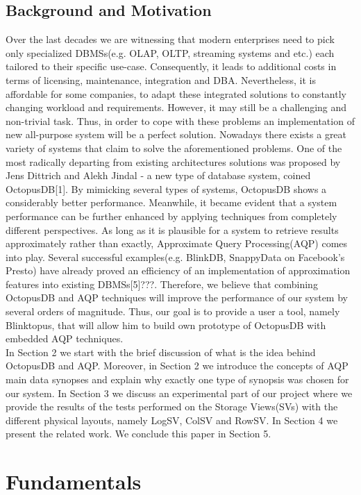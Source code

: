 \documentclass[10pt, conference, compsocconf]{IEEEtran}
\begin{document}
\subsection{Background and Motivation}
Over the last decades we are witnessing that modern enterprises need to pick only  specialized DBMSs(e.g. OLAP, OLTP, streaming systems and etc.) each tailored to their specific use-case. Consequently, it leads to additional costs in terms of licensing, maintenance, integration and DBA. Nevertheless, it is affordable for some companies, to adapt these integrated solutions to constantly changing workload and requirements. However, it may still be a challenging and non-trivial task. Thus, in order to cope with these problems an implementation of new all-purpose system will be a perfect solution. Nowadays there exists a great variety of systems that claim to solve the aforementioned problems. One of the most radically departing from existing architectures solutions was proposed by Jens Dittrich and Alekh Jindal - a new type of database system, coined OctopusDB[1]. By mimicking several types of systems, OctopusDB shows a considerably better performance. Meanwhile, it became evident that a system performance can be further enhanced by applying techniques from completely different perspectives. As long as it is plausible for a system to retrieve results approximately rather than exactly, Approximate Query Processing(AQP) comes into play. Several successful examples(e.g. BlinkDB, SnappyData on Facebook's Presto) have already proved an efficiency of an implementation of approximation features into existing DBMSs[5]???. Therefore, we believe that combining OctopusDB and AQP techniques will improve the performance of our system by several orders of magnitude. 
Thus, our goal is to provide a user a tool, namely Blinktopus, that will allow him to build own prototype of OctopusDB with embedded AQP techniques.\\
In Section 2 we start with the brief discussion of what is the idea behind OctopusDB and AQP. Moreover, in Section 2 we introduce the concepts of AQP main data synopses and explain why exactly one type of synopsis was chosen for our system. In Section 3 we discuss an experimental part of our project where we provide the results of the tests performed on the Storage Views(SVs) with the different physical layouts, namely LogSV, ColSV and RowSV. In Section 4 we present the related work. We conclude this paper in Section 5.

\section{Fundamentals}
\end{document}
